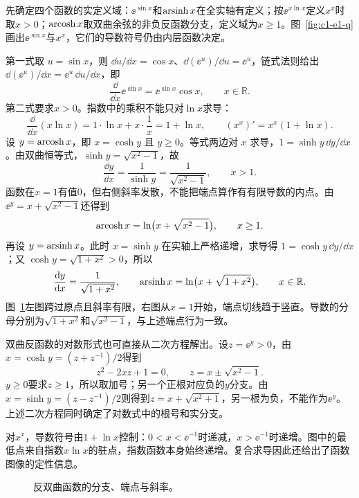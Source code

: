 \begin{solution}
先确定四个函数的实定义域：$\ee^{\sin x}$和$\operatorname{arsinh} x$在全实轴有定义；按$\ee^{x\ln x}$定义$x^x$时取$x>0$；$\operatorname{arcosh} x$取双曲余弦的非负反函数分支，定义域为$x\ge1$。图~\ref{fig:c1-e1-q}画出$\ee^{\sin x}$与$x^x$，它们的导数符号仍由内层函数决定。


第一式取 $u=\sin x$，则 $\dd u/\dd x=\cos x$、$\dd(\ee^u)/\dd u=\ee^u$，链式法则给出 $\dd(\ee^u)/\dd x=\ee^u\,\dd u/\dd x$，即
\[\frac{\dd}{\dd x}\ee^{\sin x}=\ee^{\sin x}\cos x,\qquad x\in\mathbb R.\]
第二式要求$x>0$。指数中的乘积不能只对$\ln x$求导：
\[\frac{\dd}{\dd x}(x\ln x)=1\cdot\ln x+x\cdot\frac1x=1+\ln x,\qquad
 (x^x)'=x^x(1+\ln x).\]
设 $y=\operatorname{arcosh} x$，即 $x=\cosh y$ 且 $y\ge0$。等式两边对 $x$ 求导，$1=\sinh y\,\dd y/\dd x$。由双曲恒等式，$\sinh y=\sqrt{x^2-1}$，故
\[\frac{\dd y}{\dd x}=\frac1{\sinh y}=\frac1{\sqrt{x^2-1}},\qquad x>1.\]
函数在$x=1$有值$0$，但右侧斜率发散，不能把端点算作有有限导数的内点。由$\ee^y=x+\sqrt{x^2-1}$还得到
\[\operatorname{arcosh} x=\ln\bigl(x+\sqrt{x^2-1}\bigr),\qquad x\ge1.\]
再设 $y=\operatorname{arsinh} x$。此时 $x=\sinh y$ 在实轴上严格递增，求导得 $1=\cosh y\,\dd y/\dd x$；又 $\cosh y=\sqrt{1+x^2}>0$，所以
\[\frac{\mathop{}\!\mathrm d y}{\mathop{}\!\mathrm d x}=\frac1{\sqrt{1+x^2}},\qquad
\operatorname{arsinh} x=\ln\bigl(x+\sqrt{1+x^2}\bigr),\qquad x\in\mathbb R.\]
图~\ref{fig:c1-e1-s}左图跨过原点且斜率有限，右图从$x=1$开始，端点切线趋于竖直。导数的分母分别为$\sqrt{1+x^2}$和$\sqrt{x^2-1}$，与上述端点行为一致。


双曲反函数的对数形式也可直接从二次方程解出。设$z=\ee^y>0$，由$x=\cosh y=(z+z^{-1})/2$得到
\[z^2-2xz+1=0,\qquad z=x\pm\sqrt{x^2-1}.\]
$y\ge0$要求$z\ge1$，所以取加号；另一个正根对应负的$y$分支。由$x=\sinh y=(z-z^{-1})/2$则得到$z=x+\sqrt{x^2+1}$，另一根为负，不能作为$\ee^y$。上述二次方程同时确定了对数式中的根号和实分支。

对$x^x$，导数符号由$1+\ln x$控制：$0<x<\ee^{-1}$时递减，$x>\ee^{-1}$时递增。图中的最低点来自指数$x\ln x$的驻点，指数函数本身始终递增。复合求导因此还给出了函数图像的定性信息。

\begin{figure}[H]\centering
{}
\caption{反双曲函数的分支、端点与斜率。}\label{fig:c1-e1-s}
\end{figure}
\end{solution}
